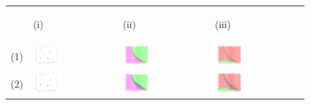 \documentclass[12pt]{UOthesis}
\theoremstyle{remarkstyle}
\begin{document}
\begin{figure}[h!]
	\centering
	\begin{tabular}{m{0.07cm} m{4.5cm}  m{4.5cm}  m{4.5cm}}
		& \begin{center}
			(i)
		\end{center} & \begin{center}
			(ii)
		\end{center} & \begin{center}
			(iii)
		\end{center}\\
		(1) & \includegraphics[width=0.33\textwidth]{HLOSimpMutualInvasion1.png} & \includegraphics[width=0.33\textwidth]{HLOSimpSSE1.png} & \includegraphics[width=0.33\textwidth]{HLOSimpE1.png}\\
		
		(2) & \includegraphics[width=0.33\textwidth]{HLOSimpMutualInvasion2.png} & \includegraphics[width=0.33\textwidth]{HLOSimpSSE2.png} & \includegraphics[width=0.33\textwidth]{HLOSimpE2.png}\\
		

\end{tabular}
\end{figure}
\end{document}
